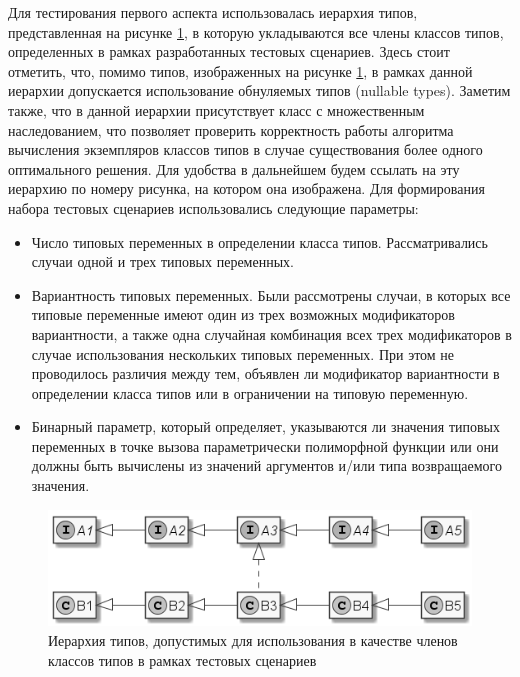 Для тестирования первого аспекта использовалась иерархия типов, представленная на рисунке \ref{fig:testing-hierarchy}, в которую укладываются все члены классов типов, определенных в рамках разработанных тестовых сценариев. Здесь стоит отметить, что, помимо типов, изображенных на рисунке \ref{fig:testing-hierarchy}, в рамках данной иерархии допускается использование обнуляемых типов (nullable types). Заметим также, что в данной иерархии присутствует класс с множественным наследованием, что позволяет проверить корректность работы алгоритма вычисления экземпляров классов типов в случае существования более одного оптимального решения. Для удобства в дальнейшем будем ссылать на эту иерархию по номеру рисунка, на котором она изображена. Для формирования набора тестовых сценариев использовались следующие параметры:
\begin{itemize}
    \item Число типовых переменных в определении класса типов. Рассматривались случаи одной и трех типовых переменных. 
    \item Вариантность типовых переменных. Были рассмотрены случаи, в которых все типовые переменные имеют один из трех возможных модификаторов вариантности, а также одна случайная комбинация всех трех модификаторов в случае использования нескольких типовых переменных. При этом не проводилось различия между тем, объявлен ли модификатор вариантности в определении класса типов или в ограничении на типовую переменную.    
    \item Бинарный параметр, который определяет, указываются ли значения типовых переменных в точке вызова параметрически полиморфной функции или они должны быть вычислены из значений аргументов и/или типа возвращаемого значения.  
\end{itemize}

\begin{figure}[htbp]
    \centering
    \includegraphics[width=\textwidth]{resources/07/02_testing_hierarchy.png}
    \caption{Иерархия типов, допустимых для использования в качестве членов классов типов в рамках тестовых сценариев}
    \label{fig:testing-hierarchy}
\end{figure}

